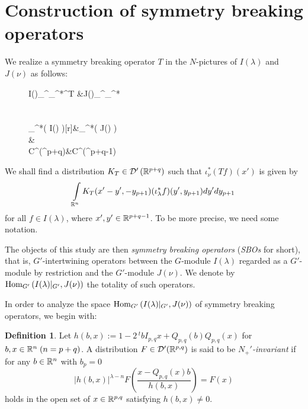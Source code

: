 \documentclass[reqno,12pt]{pja00} %
\makeatletter
\newcommand{\tmtextit}[1]{{\itshape{#1}}}
\newcommand{\Hom}{\mbox{\normalfont Hom}}
\newtheorem{fact}[theorem]{Fact}
\theoremstyle{definition}
\newtheorem{definition}[theorem]{Definition}
\let\cite\relax
\DeclareRobustCommand{\cite}{%
  \let\new@cite@pre\@gobble
  \@ifnextchar[\new@cite{\@citex[]}}
\def\new@cite[#1]{\@ifnextchar[{\new@citea{#1}}{\@citex[#1]}}
\def\new@citea#1{\def\new@cite@pre{#1}\@citex}
\theoremstyle{exampstyle} \newtheorem{examp}[theorem]{Theorem}
\renewcommand{\Q}{Q_{p,q}}
\newcommand{\IlambdaGprime}{I(\lambda)\kern-0.3em\mid_{G'}}
\newcommand{\SBO}{\Hom_{G'}\left(\IlambdaGprime,J(\nu) \right)}
\makeatother
\begin{document}
\section{Construction of symmetry breaking operators}
We realize a symmetry breaking operator $T$ in the $N$-pictures of $I(\lambda)$ and $J(\nu)$ as follows:

\begin{figure}[h]
\centering
\hspace{1.2cm}
	\xymatrix@R=1mm
	{
		I(\lambda)\ar[ddd]_{}^{\iota_\lambda^{*}}\ar[r]^T &J(\nu)\ar[ddd]_{}^{\iota_\nu^{*}}\\
		\\\\
		\iota_\lambda^*\left( I(\lambda) \right)\ar@{-->}[r]&\iota_\nu^{*}\left( J(\nu) \right)\vspace*{-1cm}\\
		\vspace*{-1cm}\bigcap&\bigcap\\
		C^\infty(\R^{p+q})&C^\infty(\R^{p+q-1})
	}
\end{figure}

We shall find a distribution $K_T\in\mathcal{D}'\left( \mathbb{R}^{p+q} \right)$ such that $\iota^*_\nu(Tf)(x')$ is given by
\begin{equation*}
	\int_{\R^n}K_T(x'-y',-y_{p+1})(\iota_\lambda^*f)(y',y_{p+1})dy'dy_{p+1}
\end{equation*}
for all $f\in I(\lambda)$, where $x',y'\in\mathbb{R}^{p+q-1}$. To be more precise, we need some notation.

The objects of this study are then \textit{symmetry breaking operators} (\textit{SBOs} for short),
that is, $G'$-intertwining operators between the $G$-module $I(\lambda)$ regarded as a $G'$-module by restriction and the $G'$-module $J(\nu)$. We denote by $\SBO$ the totality
of such operators.


In order to analyze the space $\SBO$ of symmetry breaking operators, we begin with:
\begin{definition} \label{def1}
	Let $h(b,x):=1-2\,^t\!bI_{p,q}x+\Q(b)\Q(x)$ for $b,x\in\mathbb{R}^{n}\;(n=p+q)$. A distribution
	$F \in \mathcal{D}' (\mathbb{R}^{p,q})$ is said to be
  \tmtextit{$N_+'$-invariant} if 
  for any $b\in\mathbb{R}^n$ with $b_p=0$
  \begin{equation*}
    \label{eq-Nequiv} | h(b,x) |^{\lambda - n} F \left(
    \frac{x - \Q (x) b}{h(b,x)} \right) = F (x)
  \end{equation*}
  holds in the open set of $x\in\mathbb{R}^{p,q}$ satisfying $h(b,x)\neq0$.
  
\end{definition}
\end{document}
